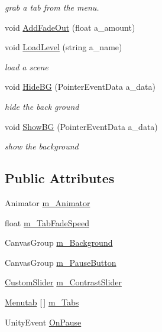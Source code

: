 \begin{DoxyCompactItemize}
\begin{DoxyCompactList}\small\item\em grab a tab from the menu. \end{DoxyCompactList}\item 
void \mbox{\hyperlink{class_in_game_menu_a816006f1832391a119ab3e7626b45ec4}{Add\+Fade\+Out}} (float a\+\_\+amount)
\item 
void \mbox{\hyperlink{class_in_game_menu_a4b43ca5c665dec97c14ff97bdb8c5958}{Load\+Level}} (string a\+\_\+name)
\begin{DoxyCompactList}\small\item\em load a scene \end{DoxyCompactList}\item 
void \mbox{\hyperlink{class_in_game_menu_afe98d4174967693826139b12ac28938c}{Hide\+BG}} (Pointer\+Event\+Data a\+\_\+data)
\begin{DoxyCompactList}\small\item\em hide the back ground \end{DoxyCompactList}\item 
void \mbox{\hyperlink{class_in_game_menu_a700ab927248cf7c6095f9d7dccea007d}{Show\+BG}} (Pointer\+Event\+Data a\+\_\+data)
\begin{DoxyCompactList}\small\item\em show the background \end{DoxyCompactList}\end{DoxyCompactItemize}
\subsection*{Public Attributes}
\begin{DoxyCompactItemize}
\item 
Animator \mbox{\hyperlink{class_in_game_menu_afcdc52f1c7ade41b9b0d91d9909f541b}{m\+\_\+\+Animator}}
\item 
float \mbox{\hyperlink{class_in_game_menu_a26e11469ba0a0281e93f15471387b9cc}{m\+\_\+\+Tab\+Fade\+Speed}}
\item 
Canvas\+Group \mbox{\hyperlink{class_in_game_menu_ab59b2f57c0fb3c4c50af476a024a4d78}{m\+\_\+\+Background}}
\item 
Canvas\+Group \mbox{\hyperlink{class_in_game_menu_a896ad1622acc55dfb0094b79ac9b854a}{m\+\_\+\+Pause\+Button}}
\item 
\mbox{\hyperlink{class_custom_slider}{Custom\+Slider}} \mbox{\hyperlink{class_in_game_menu_a7cb59c51461e455f9af122fbb13a0928}{m\+\_\+\+Contrast\+Slider}}
\item 
\mbox{\hyperlink{class_in_game_menu_1_1_menutab}{Menutab}} \mbox{[}$\,$\mbox{]} \mbox{\hyperlink{class_in_game_menu_a581412fdfb2815653a767b37503eb1e4}{m\+\_\+\+Tabs}}
\item 
Unity\+Event \mbox{\hyperlink{class_in_game_menu_a02c2f5cc6db0ebf7c27edd01a3eaf03f}{On\+Pause}}
\end{DoxyCompactItemize}
